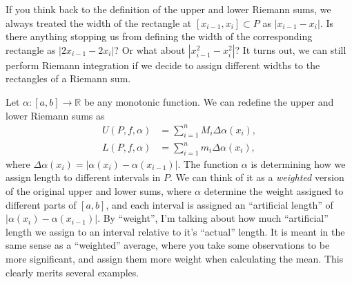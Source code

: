 \documentclass{article}
\newcommand{\R}{\mathbb{R}}
\theoremstyle{definition}
\begin{document}
If you think back to the definition of the upper and lower Riemann sums, we always treated the width of the rectangle at $ [x_{i-1},x_i]\subset P $ as $ |x_{i-1}-x_i| $. Is there anything stopping us from defining the width of the corresponding rectangle as $ |2x_{i-1}-2x_i| $? Or what about $ |x_{i-1}^2-x_i^2| $?  It turns out, we can still perform Riemann integration if we decide to assign different widths to the rectangles of a Riemann sum. 

Let $ \alpha:[a,b]\to\R $ be any monotonic function. We can redefine the upper and lower Riemann sums as 
\begin{align*}
U(P,f,\alpha)&=\sum_{i=1}^{n}M_i\Delta \alpha(x_i),\\
L(P,f,\alpha)&=\sum_{i=1}^{n}m_i\Delta \alpha(x_i),
\end{align*} 
where $\Delta\alpha(x_i)=|\alpha(x_i)-\alpha(x_{i-1})| $. The function $ \alpha $ is determining how we assign length to different intervals in $ P $. We can think of it as a \textit{weighted} version of the original upper and lower sums, where $ \alpha $ determine the weight assigned to different parts of $ [a,b] $, and each interval is assigned an ``artificial length'' of $ |\alpha(x_i)-\alpha(x_{i-1})| $. By ``weight'', I'm talking about how much ``artificial'' length we assign to an interval relative to it's ``actual'' length. It is meant in the same sense as a ``weighted'' average, where you take some observations to be more significant, and assign them more weight when calculating the mean. This clearly merits several examples.
\end{document}
